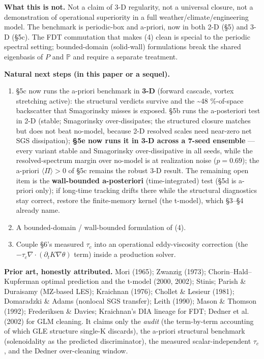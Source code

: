 \documentclass[aps,prfluids,preprint,superscriptaddress,nofootinbib]{revtex4-2}
\begin{document}
\textbf{What this is not.} Not a claim of 3-D regularity, not a universal closure, not a demonstration of operational superiority in a full weather/climate/engineering model. The benchmark is periodic-box and a-priori, now in both 2-D (§5) and 3-D (§5c). The FDT commutation that makes (4) clean is special to the periodic spectral setting; bounded-domain (solid-wall) formulations break the shared eigenbasis of $P$ and $\mathbb{P}$ and require a separate treatment.

\textbf{Natural next steps (in this paper or a sequel).}

\begin{enumerate}
\item §5c now runs the a-priori benchmark in \textbf{3-D} (forward cascade, vortex stretching active): the structural verdicts survive and the \textasciitilde{}48 \%-of-space backscatter that Smagorinsky misses is exposed. §5b runs the a-posteriori test in 2-D (stable; Smagorinsky over-dissipates; the structured closure matches but does not beat no-model, because 2-D resolved scales need near-zero net SGS dissipation); \textbf{§5e now runs it in 3-D across a 7-seed ensemble} --- every variant stable and Smagorinsky over-dissipative in all seeds, while the resolved-spectrum margin over no-model is at realization noise ($p=0.69$); the a-priori $\langle\Pi\rangle>0$ of §5c remains the robust 3-D result. The remaining open item is the \textbf{wall-bounded a-posteriori} (time-integrated) test (§5d is a-priori only); if long-time tracking drifts there while the structural diagnostics stay correct, restore the finite-memory kernel (the t-model), which §3–§4 already name.
\item A bounded-domain / wall-bounded formulation of (4).
\item Couple §6's measured $\tau _{c}$ into an operational eddy-viscosity correction (the $-\tau _{c}\nabla \cdot (\partial _{t} K\nabla \theta )$ term) inside a production solver.
\end{enumerate}

\textbf{Prior art, honestly attributed.} Mori (1965); Zwanzig (1973); Chorin–Hald–Kupferman optimal prediction and the t-model (2000, 2002); Stinis; Parish \& Duraisamy (MZ-based LES); Kraichnan (1976); Chollet \& Lesieur (1981); Domaradzki \& Adams (nonlocal SGS transfer); Leith (1990); Mason \& Thomson (1992); Frederiksen \& Davies; Kraichnan's DIA lineage for FDT; Dedner et al. (2002) for GLM cleaning. It claims only the \emph{audit} (the term-by-term accounting of which GLE structure single-K discards), the a-priori structural benchmark (solenoidality as the predicted discriminator), the measured scalar-independent $\tau _{c}$, and the Dedner over-cleaning window.
\end{document}
